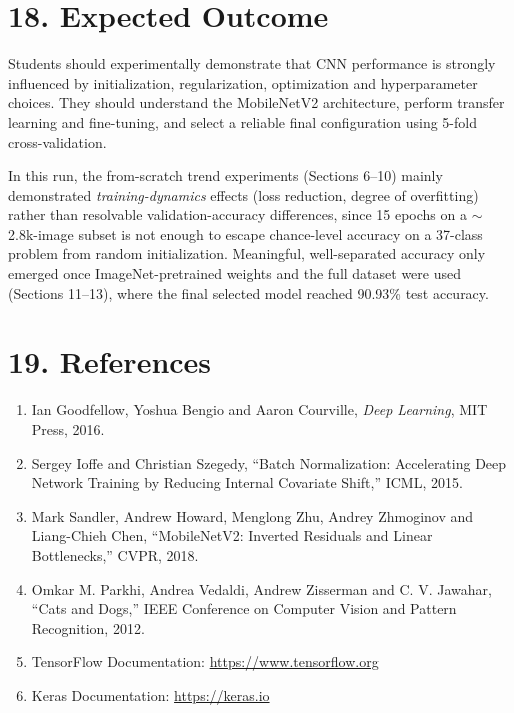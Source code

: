 \documentclass[10pt]{article}
\begin{document}
\section*{18. Expected Outcome}

Students should experimentally demonstrate that CNN performance is
strongly influenced by initialization, regularization, optimization and
hyperparameter choices. They should understand the MobileNetV2 architecture,
perform transfer learning and fine-tuning, and select a reliable final
configuration using 5-fold cross-validation.

In this run, the from-scratch trend experiments (Sections 6--10) mainly
demonstrated \emph{training-dynamics} effects (loss reduction, degree of
overfitting) rather than resolvable validation-accuracy differences,
since 15 epochs on a $\sim$2.8k-image subset is not enough to escape
chance-level accuracy on a 37-class problem from random initialization.
Meaningful, well-separated accuracy only emerged once ImageNet-pretrained
weights and the full dataset were used (Sections 11--13), where the final
selected model reached 90.93\% test accuracy.

\section*{19. References}

\begin{enumerate}
\item Ian Goodfellow, Yoshua Bengio and Aaron Courville,
\emph{Deep Learning}, MIT Press, 2016.

\item Sergey Ioffe and Christian Szegedy,
``Batch Normalization: Accelerating Deep Network Training by Reducing
Internal Covariate Shift,'' ICML, 2015.

\item Mark Sandler, Andrew Howard, Menglong Zhu, Andrey Zhmoginov and
Liang-Chieh Chen, ``MobileNetV2: Inverted Residuals and Linear
Bottlenecks,'' CVPR, 2018.

\item Omkar M. Parkhi, Andrea Vedaldi, Andrew Zisserman and C. V. Jawahar,
``Cats and Dogs,'' IEEE Conference on Computer Vision and Pattern
Recognition, 2012.

\item TensorFlow Documentation:
\url{https://www.tensorflow.org}

\item Keras Documentation:
\url{https://keras.io}
\end{enumerate}
\end{document}
